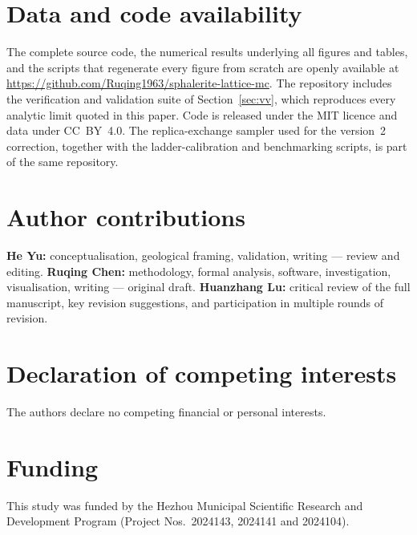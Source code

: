 \documentclass[11pt,a4paper]{article}
\begin{document}
\section*{Data and code availability}

The complete source code, the numerical results underlying all figures and
tables, and the scripts that regenerate every figure from scratch are openly
available at
\url{https://github.com/Ruqing1963/sphalerite-lattice-mc}. The repository
includes the verification and validation suite of Section~\ref{sec:vv}, which
reproduces every analytic limit quoted in this paper. Code is released under the
MIT licence and data under CC~BY~4.0. The replica-exchange sampler used for the
version~2 correction, together with the ladder-calibration and benchmarking
scripts, is part of the same repository.

\section*{Author contributions}

\textbf{He Yu:} conceptualisation, geological framing, validation, writing ---
review and editing. \textbf{Ruqing Chen:} methodology, formal analysis,
software, investigation, visualisation, writing --- original draft.
\textbf{Huanzhang Lu:} critical review of the full manuscript, key
revision suggestions, and participation in multiple rounds of revision.

\section*{Declaration of competing interests}

The authors declare no competing financial or personal interests.

\section*{Funding}

This study was funded by the Hezhou Municipal Scientific Research and
Development Program (Project Nos.\ 2024143, 2024141 and 2024104).
\end{document}
